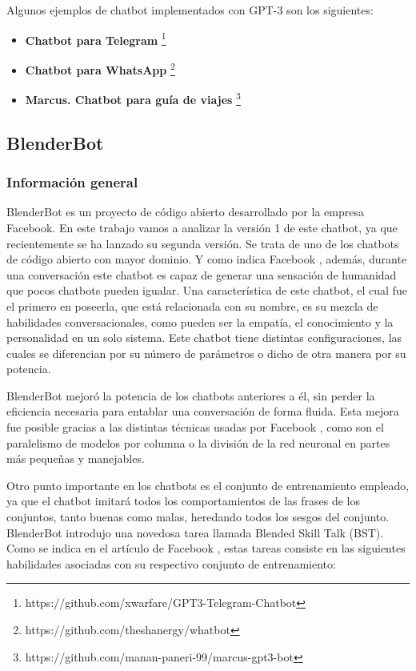Algunos ejemplos de chatbot implementados con GPT-3 son los siguientes:

\begin{itemize}
\item \textbf{Chatbot para Telegram} \footnote{https://github.com/xwarfare/GPT3-Telegram-Chatbot}
\item \textbf{Chatbot para WhatsApp} \footnote{https://github.com/theshanergy/whatbot}
\item \textbf{Marcus. Chatbot para guía de viajes} \footnote{https://github.com/manan-paneri-99/marcus-gpt3-bot}
\end{itemize}


\subsection{BlenderBot}

\subsubsection*{Información general}

BlenderBot es un proyecto de código abierto desarrollado por la empresa Facebook. En este trabajo vamos a analizar la versión 1 de este chatbot, ya que recientemente se ha lanzado su segunda versión. Se trata de uno de los chatbots de código abierto con mayor dominio. Y como indica Facebook \cite{RefWorks:RefID:41-roller2020recipes}, además, durante una conversación este chatbot es capaz de generar una sensación de humanidad que pocos chatbots pueden igualar. Una característica de este chatbot, el cual fue el primero en poseerla, que está relacionada con su nombre, es su mezcla de habilidades conversacionales, como pueden ser la empatía, el conocimiento y la personalidad en un solo sistema. Este chatbot tiene distintas configuraciones, las cuales se diferencian por su número de parámetros o dicho de otra manera por su potencia.

BlenderBot mejoró la potencia de los chatbots anteriores a él, sin perder la eficiencia necesaria para entablar una conversación de forma fluida. Esta mejora fue posible gracias a las distintas técnicas usadas por Facebook \cite{RefWorks:RefID:41-roller2020recipes}, como son el paralelismo de modelos por columna o la división de la red neuronal en partes más pequeñas y manejables.

Otro punto importante en los chatbots es el conjunto de entrenamiento empleado, ya que el chatbot imitará todos los comportamientos de las frases de los conjuntos, tanto buenas como malas, heredando todos los sesgos del conjunto. BlenderBot introdujo una novedosa tarea llamada Blended Skill Talk (BST). Como se indica en el artículo de Facebook \cite{RefWorks:RefID:41-roller2020recipes}, estas tareas consiste en las siguientes habilidades asociadas con su respectivo conjunto de entrenamiento:

